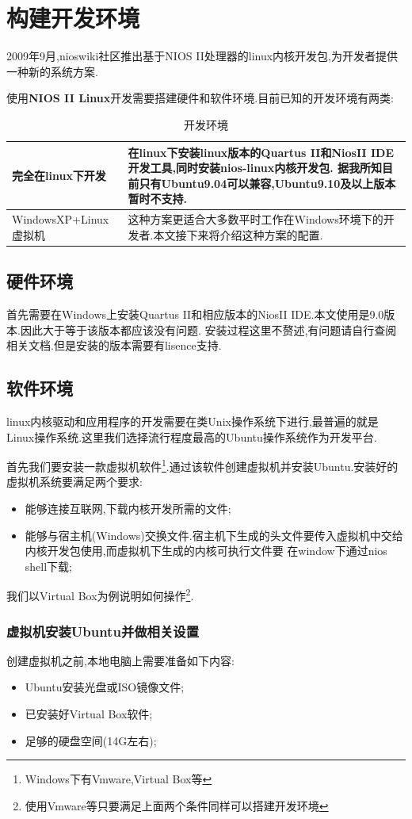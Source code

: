 \documentclass[12pt,a4paper,titlepage]{article}
\begin{document}
\section{构建开发环境}
\setcounter{footnote}{0}
2009年9月,nioswiki社区推出基于NIOS II处理器的linux内核开发包,为开发者提供一种新的系统方案.

使用\textbf{NIOS II Linux}开发需要搭建硬件和软件环境.目前已知的开发环境有两类:
\begin{table}[!hbtp]
\centering
\begin{tabular}{|l|p{}|}
\hline
完全在linux下开发 & 在linux下安装linux版本的Quartus II和NiosII IDE开发工具,同时安装nios-linux内核开发包.
据我所知目前只有\textbf{Ubuntu9.04}可以兼容,Ubuntu9.10及以上版本暂时不支持.\\
\hline
WindowsXP+Linux虚拟机 & 这种方案更适合大多数平时工作在Windows环境下的开发者.本文接下来将介绍这种方案的配置.\\
\hline
\end{tabular}
\caption{开发环境\label{dev_env}}
\end{table}
\subsection{硬件环境}
首先需要在Windows上安装Quartus II和相应版本的NiosII IDE.本文使用是9.0版本.因此大于等于该版本都应该没有问题.
安装过程这里不赘述,有问题请自行查阅相关文档.但是安装的版本{需要有lisence支持}.
\subsection{软件环境}
linux内核驱动和应用程序的开发需要在类Unix操作系统下进行,最普遍的就是Linux操作系统.这里我们选择流行程度最高的Ubuntu操作系统作为开发平台.

首先我们要安装一款虚拟机软件\footnote{Windows下有Vmware,Virtual Box等}.通过该软件创建虚拟机并安装Ubuntu.安装好的虚拟机系统要满足两个要求:
\begin{itemize}
\item 能够连接互联网,下载内核开发所需的文件;
\item 能够与宿主机(Windows)交换文件.宿主机下生成的头文件要传入虚拟机中交给内核开发包使用,而虚拟机下生成的内核可执行文件要
在window下通过nios shell下载;
\end{itemize}

我们以Virtual Box为例说明如何操作\footnote{使用Vmware等只要满足上面两个条件同样可以搭建开发环境}.
\subsubsection{虚拟机安装Ubuntu并做相关设置}
创建虚拟机之前,本地电脑上需要准备如下内容:
\begin{itemize}
\item Ubuntu安装光盘或ISO镜像文件;
\item 已安装好Virtual Box软件;
\item 足够的硬盘空间(14G左右);
\end{itemize}
\end{document}
